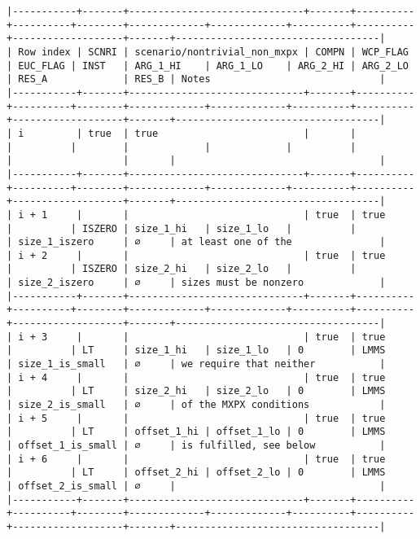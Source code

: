 \documentclass[varwidth=\maxdimen,margin=0.5cm,multi={verbatim}]{standalone}
\begin{document}
\begin{verbatim}
|-----------+-------+------------------------------+-------+----------+----------+--------+-------------+-------------+----------+----------+-------------------+-------+-----------------------------------|
| Row index | SCNRI | scenario/nontrivial_non_mxpx | COMPN | WCP_FLAG | EUC_FLAG | INST   | ARG_1_HI    | ARG_1_LO    | ARG_2_HI | ARG_2_LO | RES_A             | RES_B | Notes                             |
|-----------+-------+------------------------------+-------+----------+----------+--------+-------------+-------------+----------+----------+-------------------+-------+-----------------------------------|
| i         | true  | true                         |       |          |          |        |             |             |          |          |                   |       |                                   |
|-----------+-------+------------------------------+-------+----------+----------+--------+-------------+-------------+----------+----------+-------------------+-------+-----------------------------------|
| i + 1     |       |                              | true  | true     |          | ISZERO | size_1_hi   | size_1_lo   |          |          | size_1_iszero     | ∅     | at least one of the               |
| i + 2     |       |                              | true  | true     |          | ISZERO | size_2_hi   | size_2_lo   |          |          | size_2_iszero     | ∅     | sizes must be nonzero             |
|-----------+-------+------------------------------+-------+----------+----------+--------+-------------+-------------+----------+----------+-------------------+-------+-----------------------------------|
| i + 3     |       |                              | true  | true     |          | LT     | size_1_hi   | size_1_lo   | 0        | LMMS     | size_1_is_small   | ∅     | we require that neither           |
| i + 4     |       |                              | true  | true     |          | LT     | size_2_hi   | size_2_lo   | 0        | LMMS     | size_2_is_small   | ∅     | of the MXPX conditions            |
| i + 5     |       |                              | true  | true     |          | LT     | offset_1_hi | offset_1_lo | 0        | LMMS     | offset_1_is_small | ∅     | is fulfilled, see below           |
| i + 6     |       |                              | true  | true     |          | LT     | offset_2_hi | offset_2_lo | 0        | LMMS     | offset_2_is_small | ∅     |                                   |
|-----------+-------+------------------------------+-------+----------+----------+--------+-------------+-------------+----------+----------+-------------------+-------+-----------------------------------|

\end{verbatim}
\end{document}

